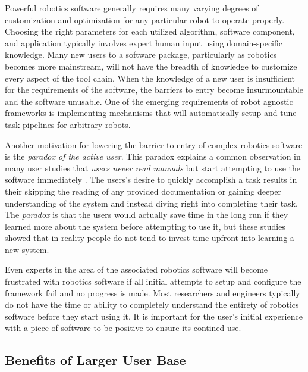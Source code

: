 \documentclass[10pt,journal,compsoc]{joser1}
\begin{document}
{Powerful robotics software generally requires many varying degrees of
customization and optimization for any particular robot to operate properly.
Choosing the right parameters for each utilized algorithm, software component,
and application typically involves expert human input using domain-specific
knowledge. Many new users to a software package, particularly as robotics
becomes more mainstream, will not have the breadth of knowledge to customize
every aspect of the tool chain. When the knowledge of a new user is insufficient
for the requirements of the software, the barriers to entry become
insurmountable and the software unusable. One of the emerging requirements of
robot agnostic frameworks is implementing mechanisms that will automatically
setup and tune task pipelines for arbitrary robots.

Another motivation for lowering the barrier to entry of complex robotics
software is the \textit{paradox of the active user}. This paradox explains a
common observation in many user studies that \textit{users never read manuals}
but start attempting to use the software immediately
\cite{carroll1987interfacing}. The users's desire to quickly accomplish a task
results in their skipping the reading of any provided documentation or gaining
deeper understanding of the system and instead diving right into completing
their task. The \textit{paradox} is that the users would actually save time in
the long run if they learned more about the system before attempting to use it,
but these studies showed that in reality people do not tend to invest time
upfront into learning a new system.

Even experts in the area of the associated robotics software will become
frustrated with robotics software if all initial attempts to setup and configure
the framework fail and no progress is made. Most researchers and engineers
typically do not have the time or ability to completely understand the entirety
of robotics software before they start using it. It is important for the
user's initial experience with a piece of software to be positive to ensure its
contined use.

\subsection{Benefits of Larger User Base}

}
\end{document}
